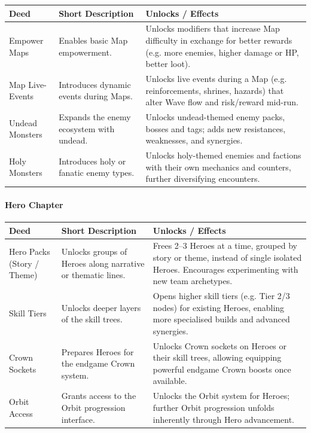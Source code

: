 \begin{center}
	\begin{tabular}{p{3.2cm}p{4cm}p{8cm}}
		\textbf{Deed} & \textbf{Short Description} & \textbf{Unlocks / Effects} \\
		\hline
		Empower Maps &
		Enables basic Map empowerment. &
		Unlocks modifiers that increase Map difficulty in exchange for better rewards (e.g. more enemies, higher damage or HP, better loot). \\
		\hline
		Map Live-Events &
		Introduces dynamic events during Maps. &
		Unlocks live events during a Map (e.g. reinforcements, shrines, hazards) that alter Wave flow and risk/reward mid-run. \\
		\hline
		Undead Monsters &
		Expands the enemy ecosystem with undead. &
		Unlocks undead-themed enemy packs, bosses and tags; adds new resistances, weaknesses, and synergies. \\
		\hline
		Holy Monsters &
		Introduces holy or fanatic enemy types. &
		Unlocks holy-themed enemies and factions with their own mechanics and counters, further diversifying encounters. \\
	\end{tabular}
\end{center}


\paragraph{Hero Chapter}

\begin{center}
	\begin{tabular}{p{3.2cm}p{4cm}p{8cm}}
		\textbf{Deed} & \textbf{Short Description} & \textbf{Unlocks / Effects} \\
		\hline
		Hero Packs (Story / Theme) &
		Unlocks groups of Heroes along narrative or thematic lines. &
		Frees 2--3 Heroes at a time, grouped by story or theme, instead of single isolated Heroes. Encourages experimenting with new team archetypes. \\
		\hline
		Skill Tiers &
		Unlocks deeper layers of the skill trees. &
		Opens higher skill tiers (e.g. Tier 2/3 nodes) for existing Heroes, enabling more specialised builds and advanced synergies. \\
		\hline
		Crown Sockets &
		Prepares Heroes for the endgame Crown system. &
		Unlocks Crown sockets on Heroes or their skill trees, allowing equipping powerful endgame Crown boosts once available. \\
		\hline
		Orbit Access &
		Grants access to the Orbit progression interface. &
		Unlocks the Orbit system for Heroes; further Orbit progression unfolds inherently through Hero advancement. \\
	\end{tabular}
\end{center}


